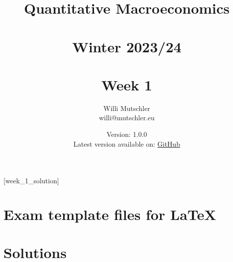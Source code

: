 
\newif\ifDisplaySolutions\DisplaySolutionstrue


\title{Quantitative Macroeconomics\\~\\Winter 2023/24\\~\\Week 1}
\author{Willi Mutschler\\willi@mutschler.eu}
\date{Version: 1.0.0\\Latest version available on: \href{https://github.com/wmutschl/Quantitative-Macroeconomics/releases/latest/download/week_1.pdf}{GitHub}}
\maketitle\thispagestyle{empty}

\newpage
{}[week_1_solution]
\tableofcontents\thispagestyle{empty}\newpage

\setcounter{page}{1}
\newpage
\newpage
\newpage
\newpage
\printbibliography
\newpage
\appendix
\section{Exam template files for \LaTeX}




\ifDisplaySolutions
\newpage
\section{Solutions}

\fi
